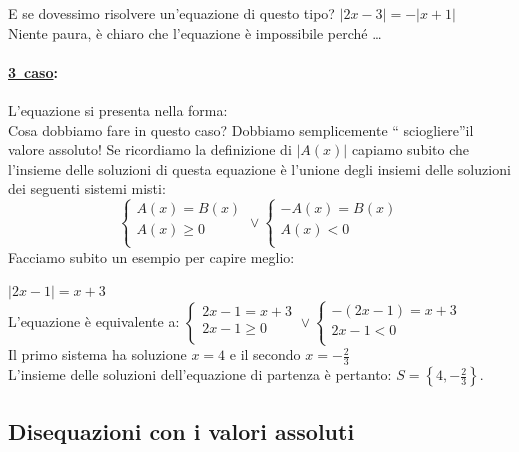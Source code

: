 \begin{esempio}
E se dovessimo risolvere un'equazione di questo tipo? \(|2x-3|=-|x+1|\) \\[4pt]
Niente paura, è chiaro che l'equazione è impossibile perché \dots
\end{esempio}

\paragraph{\underline{3\textdegree~caso}:} L'equazione si presenta nella forma:  
\\[4pt]
Cosa dobbiamo fare in questo caso? Dobbiamo semplicemente \textquotedblleft 
sciogliere\textquotedblright il valore assoluto!
Se ricordiamo la definizione di $|A(x)|$ capiamo subito che l'insieme delle 
soluzioni di questa equazione è l'unione degli insiemi delle soluzioni dei 
seguenti sistemi misti:
$$
\left\lbrace 
\begin{array}{l}
A(x)=B(x)\\
A(x)\geq 0\\
\end{array}
\right.
\vee
\left\lbrace 
\begin{array}{l}
-A(x)=B(x)\\
A(x)< 0\\
\end{array}
\right.
$$
Facciamo subito un esempio per capire meglio:
\begin{esempio}  \(|2x-1|=x+3\)\\[4pt] L'equazione è equivalente a:
\(
\left\lbrace 
\begin{array}{l}
2x-1=x+3\\
2x-1\geq 0\\
\end{array}
\right.
\vee
\left\lbrace 
\begin{array}{l}
-(2x-1)=x+3\\
2x-1< 0\\
\end{array}
\right.
\) \\
Il primo sistema ha soluzione $x=4$ e il secondo $x=-\frac{2}{3}$\\[4pt]
L'insieme delle soluzioni dell'equazione di partenza è pertanto: 
$S=\left\lbrace 4,-\frac{2}{3} \right\rbrace $.
\end{esempio}

\subsection{Disequazioni con i valori assoluti}


